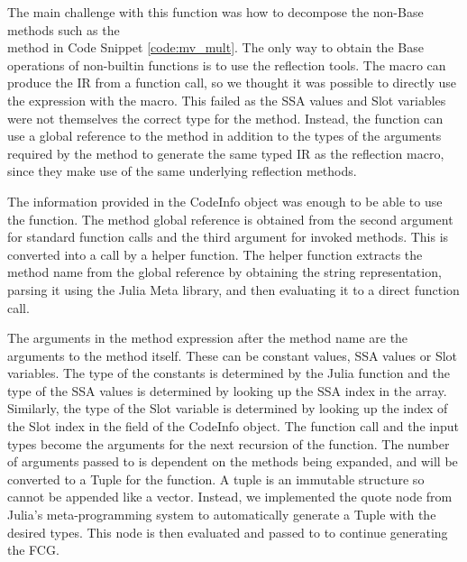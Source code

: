 \pagebreak

The main challenge with this function was how to decompose the non-Base methods such as the\\  method in Code Snippet \ref{code:mv_mult}. The only way to obtain the Base operations of non-builtin functions is to use the reflection tools. The  macro can produce the IR from a function call, so we thought it was possible to directly use the expression with the macro. This failed as the SSA values and Slot variables were not themselves the correct type for the method. Instead, the  function can use a global reference to the method in addition to the types of the arguments required by the method to generate the same typed IR as the reflection macro, since they make use of the same underlying reflection methods.

The information provided in the CodeInfo object was enough to be able to use the  function. The method global reference is obtained from the second argument for standard function calls and the third argument for invoked methods. This is converted into a call by a helper function. The helper function extracts the method name from the global reference by obtaining the string representation, parsing it using the Julia Meta library, and then evaluating it to a direct function call.

The arguments in the method expression after the method name are the arguments to the method itself. These can be constant values, SSA values or Slot variables. The type of the constants is determined by the  Julia function and the type of the SSA values is determined by looking up the SSA index in the  array. Similarly, the type of the Slot variable is determined by looking up the index of the Slot index in the  field of the CodeInfo object. The function call and the input types become the arguments for the next recursion of the  function. The number of arguments passed to  is dependent on the methods being expanded, and will be converted to a Tuple for the  function. A tuple is an immutable structure so cannot be appended like a vector. Instead, we implemented the quote node from Julia's meta-programming system to automatically generate a Tuple with the desired types. This node is then evaluated and passed to  to continue generating the FCG.

\pagebreak

